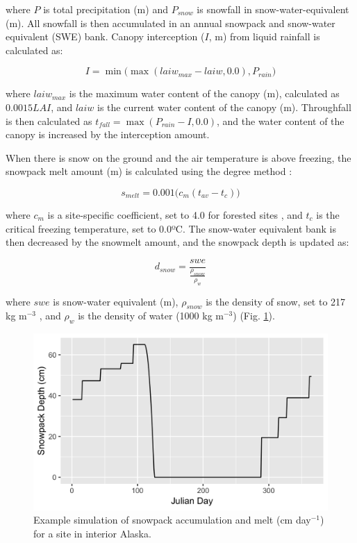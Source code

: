 \documentclass[a4paper, 12pt] {report}
\begin{document}
where $P$ is total precipitation (m) and $P_{snow}$ is snowfall in snow-water-equivalent (m). All snowfall is then accumulated in an annual snowpack and snow-water equivalent (SWE) bank. Canopy interception ($I$, m) from liquid rainfall is calculated as:

\begin{equation}
I = \min\Big(\max(laiw_{max} - laiw, 0.0), P_{rain}\Big)
\end{equation}

where $laiw_{max}$ is the maximum water content of the canopy (m), calculated as $0.0015LAI$, and $laiw$ is the current water content of the canopy (m). Throughfall is then calculated as $t_{fall} = \max(P_{rain} - I, 0.0)$, and the water content of the canopy is increased by the interception amount.

When there is snow on the ground and the air temperature is above freezing, the snowpack melt amount (m) is calculated using the degree method :

\begin{equation}
s_{melt} = 0.001\Big(c_m(t_{av} - t_c)\Big)
\end{equation}

where $c_m$ is a site-specific coefficient, set to 4.0 for forested sites , and $t_c$ is the critical freezing temperature, set to 0.0ºC. The snow-water equivalent bank is then decreased by the snowmelt amount, and the snowpack depth is updated as:

\begin{equation}
d_{snow} = \frac{swe}{\frac{\rho_{snow}}{\rho_w}}
\end{equation}

where $swe$ is snow-water equivalent (m), $\rho_{snow}$ is the density of snow, set to 217 kg m$^{-3}$ \cite{sturmEstimatingSnowWater2010}, and $\rho_w$ is the density of water (1000 kg m$^{-3}$) (Fig. \ref{fig:snow}). 

\begin{figure}
  \includegraphics[width=0.8\linewidth]{Figures/SnowPack.png}
  \caption{Example simulation of snowpack accumulation and melt (cm day$^{-1}$) for a site in interior Alaska.}
  \label{fig:snow}
\end{figure} 
\end{document}
